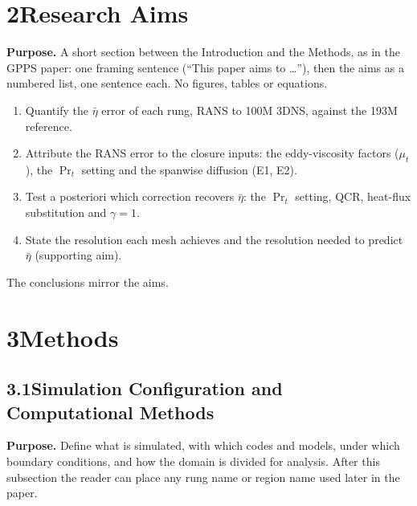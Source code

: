 \documentclass[10pt]{article}
\begin{document}
\section*{2\quad Research Aims}
\textbf{Purpose.} A short section between the Introduction and the Methods, as in the GPPS paper: one framing
sentence (``This paper aims to \dots''), then the aims as a numbered list, one sentence each. No figures, tables
or equations.
\begin{enumerate}[label=\arabic*.]
\item Quantify the $\bar\eta$ error of each rung, RANS to 100M 3DNS, against the 193M reference.
\item Attribute the RANS error to the closure inputs: the eddy-viscosity factors ($\mu_t$), the $\Pr_t$ setting
  and the spanwise diffusion (E1, E2).
\item Test a posteriori which correction recovers $\bar\eta$: the $\Pr_t$ setting, QCR, heat-flux substitution and
  $\gamma=1$.
\item State the resolution each mesh achieves and the resolution needed to predict $\bar\eta$ (supporting aim).
\end{enumerate}
The conclusions mirror the aims.

\setcounter{figure}{0}
\setcounter{table}{0}
\section*{3\quad Methods}

\subsection*{3.1\quad Simulation Configuration and Computational Methods}
\textbf{Purpose.} Define what is simulated, with which codes and models, under which boundary conditions, and
how the domain is divided for analysis. After this subsection the reader can place any rung name or region name
used later in the paper.
\end{document}
